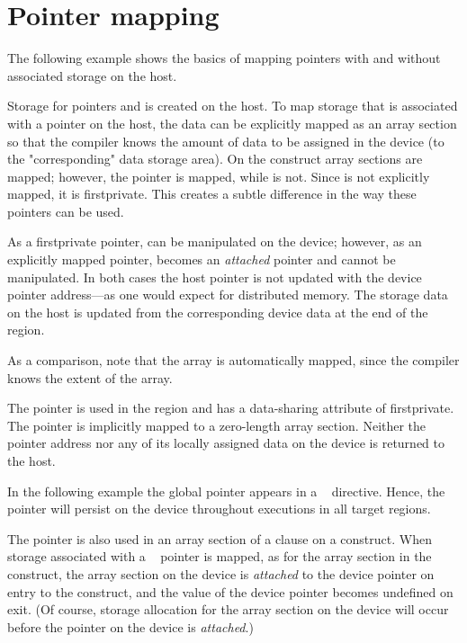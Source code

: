 \pagebreak
\section{Pointer mapping}
\label{sec:pointer_mapping}

The following example shows the basics of mapping pointers with and without
associated storage on the host.

Storage for pointers  and  is created on the host. 
To map storage that is associated with a pointer on the host, the data can be
explicitly mapped as an array section so that the compiler knows 
the amount of data to be assigned in the device (to the "corresponding" data storage area).
On the  construct array sections are mapped; however, the pointer 
is mapped, while  is not. Since  is not explicitly mapped, it is
firstprivate.  This creates a subtle difference in the way these pointers can be used.

As a firstprivate pointer,  can be manipulated on the device;
however, as an explicitly mapped pointer, 
 becomes an \emph{attached} pointer and cannot be manipulated.
In both cases the host pointer is not updated with the device pointer 
address---as one would expect for distributed memory. 
The storage data on the host is updated from the corresponding device
data at the end of the  region.

As a comparison, note that the  array is automatically mapped, 
since the compiler knows the extent of the array. 

The pointer  is used in the  region and has
a data-sharing attribute of firstprivate.  
The pointer is implicitly mapped to a zero-length array section.
Neither the pointer address nor any 
of its locally assigned data on the device is returned
to the host.  


In the following example the global pointer  appears in a
~ directive.  Hence, the pointer  will 
persist on the device throughout executions in all target regions.  

The pointer is also used in an array section of a  clause on 
a  construct.  When storage associated with 
a ~ pointer
is mapped, as for the array section  in the
 construct, the array section on the device is \emph{attached}
to the device pointer  on entry to the construct, and
the value of the device pointer  becomes undefined on exit. 
(Of course, storage allocation for
the array section on the device will occur before the 
pointer on the device is \emph{attached}.)

